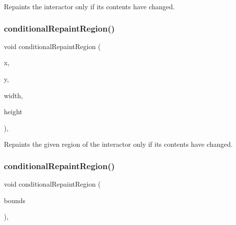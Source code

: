 Repaints the interactor only if its contents have changed. 

\mbox{\label{classGDrawingSurface_aedd4b792311d946eeaf44b0de337a408}} 
\subsubsection{\texorpdfstring{conditional\+Repaint\+Region()}{conditionalRepaintRegion()}\hspace{0.1cm}{\footnotesize\ttfamily [1/2]}}
{\footnotesize\ttfamily void conditional\+Repaint\+Region (\begin{DoxyParamCaption}\item[{int}]{x,  }\item[{int}]{y,  }\item[{int}]{width,  }\item[{int}]{height }\end{DoxyParamCaption})\hspace{0.3cm}{\ttfamily [virtual]}, {\ttfamily [inherited]}}



Repaints the given region of the interactor only if its contents have changed. 

\mbox{\label{classGDrawingSurface_a3932a12278752db368e24fa404e446aa}} 
\subsubsection{\texorpdfstring{conditional\+Repaint\+Region()}{conditionalRepaintRegion()}\hspace{0.1cm}{\footnotesize\ttfamily [2/2]}}
{\footnotesize\ttfamily void conditional\+Repaint\+Region (\begin{DoxyParamCaption}\item[{const \mbox{\hyperlink{classGRectangle}{G\+Rectangle}} \&}]{bounds }\end{DoxyParamCaption})\hspace{0.3cm}{\ttfamily [virtual]}, {\ttfamily [inherited]}}



